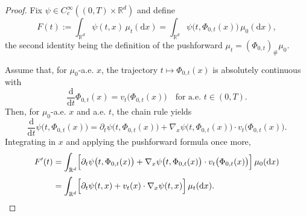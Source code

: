 \documentclass[12pt,a4paper,oneside]{book}
\begin{document}
\begin{proof}
Fix $\psi\in C_c^\infty((0,T)\times\mathbb{R}^d)$ and define
\begin{equation*}
    F(t):=\int_{\mathbb{R}^d}\psi(t,x)\,\mu_t(\mathrm{d}x) 
    = \int_{\mathbb{R}^d}\psi\bigl(t,\Phi_{0,t}(x)\bigr)\,\mu_0(\mathrm{d}x),
\end{equation*}
the second identity being the definition of the pushforward $\mu_t=(\Phi_{0,t})_\#\mu_0$.

Assume that, for $\mu_0$-a.e. $x$, the trajectory $t\mapsto\Phi_{0,t}(x)$ is absolutely continuous with
\begin{equation*}
    \frac{\mathrm{d}}{\mathrm{d}t}\Phi_{0,t}(x)=v_t\bigl(\Phi_{0,t}(x)\bigr) \quad\text{for a.e. } t\in(0,T).
\end{equation*}
Then, for $\mu_0$-a.e. $x$ and a.e. $t$, the chain rule yields
\begin{equation*}
    \frac{\mathrm{d}}{\mathrm{d}t}\psi\bigl(t,\Phi_{0,t}(x)\bigr)
    = \partial_t\psi\bigl(t,\Phi_{0,t}(x)\bigr) + \nabla_x\psi\bigl(t,\Phi_{0,t}(x)\bigr)\cdot v_t\bigl(\Phi_{0,t}(x)\bigr).
\end{equation*}
Integrating in $x$ and applying the pushforward formula once more,
\begin{equation}
    \begin{aligned}
        F'(t) &=\int_{\mathbb{R}^d}
            \Bigl[
                \partial_t\psi\bigl(t,\Phi_{0,t}(x)\bigr) + \nabla_x\psi\bigl(t,\Phi_{0,t}(x)\bigr)\cdot v_t\bigl(\Phi_{0,t}(x)\bigr)
            \Bigr]\,\mu_0(\mathrm{d}x) \\[2pt]
        &=\int_{\mathbb{R}^d}
            \Bigl[
                \partial_t\psi(t,x)+v_t(x)\cdot\nabla_x\psi(t,x)
            \Bigr]\,\mu_t(\mathrm{d}x).
    \end{aligned}
    \label{eq:F-prime}
\end{equation}


\end{proof}
\end{document}
